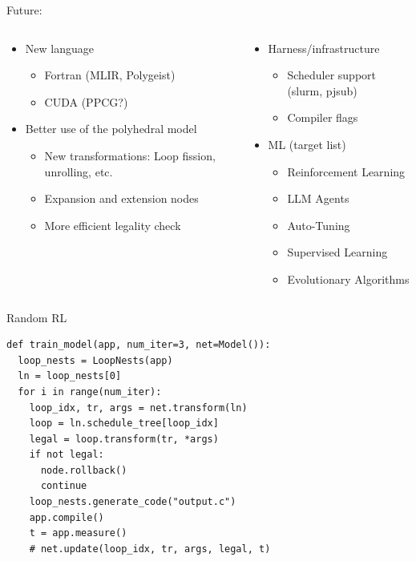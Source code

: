 \documentclass[presentation, aspectratio=169]{beamer}
\begin{document}
\begin{frame}[label={sec:org0cd5127}]{Future:}
\begin{columns}
\begin{column}{0.48\columnwidth}
\begin{itemize}
\item New language
\begin{itemize}
\item Fortran (MLIR, Polygeist)
\item CUDA (PPCG?)
\end{itemize}
\item Better use of the polyhedral model
\begin{itemize}
\item New transformations: Loop fission, unrolling, etc.
\item Expansion and extension nodes
\item More efficient legality check
\end{itemize}
\end{itemize}
\end{column}
\begin{column}{0.48\columnwidth}
\begin{itemize}
\item Harness/infrastructure
\begin{itemize}
\item Scheduler support (slurm, pjsub)
\item Compiler flags
\end{itemize}
\item ML (target list)
\begin{itemize}
\item Reinforcement Learning
\item LLM Agents
\item Auto-Tuning
\item Supervised Learning
\item Evolutionary Algorithms
\end{itemize}
\end{itemize}
\end{column}
\end{columns}
\end{frame}
\begin{frame}[label={sec:org55d3329},fragile]{Random RL}
 \begin{verbatim}
def train_model(app, num_iter=3, net=Model()):
  loop_nests = LoopNests(app)
  ln = loop_nests[0]
  for i in range(num_iter):
    loop_idx, tr, args = net.transform(ln)
    loop = ln.schedule_tree[loop_idx]
    legal = loop.transform(tr, *args)
    if not legal:
      node.rollback()
      continue
    loop_nests.generate_code("output.c")
    app.compile()
    t = app.measure()
    # net.update(loop_idx, tr, args, legal, t)
\end{verbatim}
\end{frame}
\end{document}
